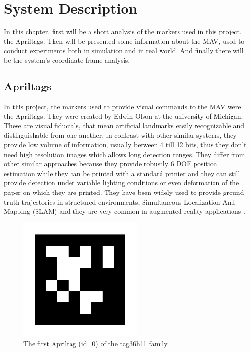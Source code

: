 \chapter{System Description}
\label{sec:SystemDescription}

In this chapter, first will be a short analysis of the markers used in this project, the Apriltags. Then will be presented some information about the MAV, used to conduct experiments both in simulation and in real world. And finally there will be the system's coordinate frame analysis.

\section{Apriltags}
\label{sec:apriltags} 

In this project, the markers used to provide visual commands to the MAV were the Apriltags. They were created by Edwin Olson at the university of Michigan. These are visual fiducials, that mean artificial landmarks easily recognizable and distinguishable from one another. In contrast with other similar systems, they provide low volume of information, usually between 4 till 12 bits, thus they don't need high resolution images which allows long detection ranges. They differ from other similar approaches because they provide robustly 6 DOF position estimation while they can be printed with a standard printer and they can still provide detection under variable lighting conditions or even deformation of the paper on which they are printed. They have been widely used to provide ground truth trajectories in structured environments, Simultaneous Localization And Mapping (SLAM) and they are very common in augmented reality applications \cite{olson2011tags}.

\begin{figure}
   \centering
   \includegraphics[width=0.55\textwidth]{images/tag36h11_im_large.pdf}
   \caption{The first Apriltag (id=0) of the tag36h11 family}
   \label{pics:tag36h11}
\end{figure}
 
